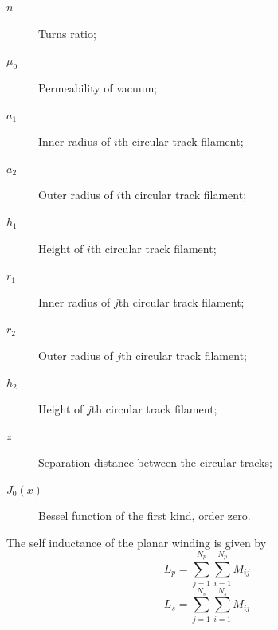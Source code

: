 \documentclass[conference]{IEEEtran}
\begin{document}
\begin{description}
\item[\hspace{-10pt}$ n $]        \hspace{-15pt} Turns ratio;
\item[\hspace{-10pt}$ \mu_{0} $]  \hspace{-15pt} Permeability of vacuum;
\item[\hspace{-10pt}$ a_{1} $]    \hspace{-15pt} Inner radius of $i$th circular track filament;
\item[\hspace{-10pt}$ a_{2} $]    \hspace{-15pt} Outer radius of $i$th circular track filament;
\item[\hspace{-10pt}$ h_{1} $]    \hspace{-15pt} Height of $i$th circular track filament;
\item[\hspace{-10pt}$ r_{1} $]    \hspace{-15pt} Inner radius of $j$th circular track filament;
\item[\hspace{-10pt}$ r_{2} $]    \hspace{-15pt} Outer radius of $j$th circular track filament;
\item[\hspace{-10pt}$ h_{2} $]    \hspace{-15pt} Height of $j$th circular track filament;
\item[\hspace{-10pt}$ z $]        \hspace{-15pt} Separation distance between the circular tracks;
\item[\hspace{-10pt}$ J_{0}(x) $] \hspace{-15pt} Bessel function of the first kind, order zero.
\end{description}
%
The self inductance of the planar winding \cite{HurleyDuffy} is given by
\begin{equation}
	L_{p} = \sum\limits_{j=1}^{N_{p}}{\sum\limits_{i=1}^{N_{p}}{M_{ij}}}
\end{equation}
%
\begin{equation}
	L_{s} = \sum\limits_{j=1}^{N_{s}}{\sum\limits_{i=1}^{N_{s}}{M_{ij}}}
\end{equation}
\end{document}

